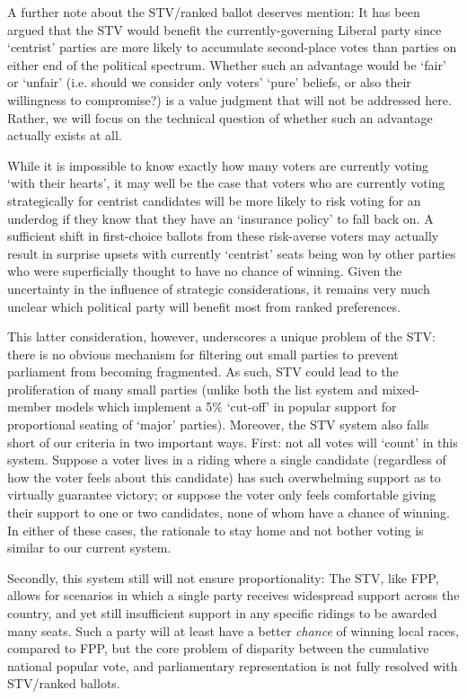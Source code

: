 \documentclass[DIV=calc, paper=a4, fontsize=11pt, twocolumn]{scrartcl}	 %
\begin{document}
A further note about the STV/ranked ballot deserves mention: It has been argued\cite{Record}
 that the STV would benefit the currently-governing Liberal party since  `centrist' parties are more likely to accumulate second-place votes than parties on either end of the political spectrum. 
Whether such an advantage would be `fair' or `unfair' (i.e. should we consider only voters' `pure' beliefs, or also their willingness to compromise?) is a value judgment that will not be addressed here. Rather, we will focus on the technical question of whether such an advantage actually exists at all.

While it is impossible to know exactly how many voters are currently voting `with their hearts', it may well be the case that voters who are currently voting strategically for centrist candidates will be more likely to risk voting for an underdog if they know that they have an `insurance policy' to fall back on. 
A sufficient shift in first-choice ballots from these risk-averse voters may actually result in surprise upsets with currently `centrist' seats being won by other parties who were superficially thought to have no chance of winning. Given the uncertainty in the influence of strategic considerations, it remains very much unclear which political party will benefit most from ranked preferences. 

This latter consideration, however, underscores a unique problem of the STV:  there is no obvious mechanism for filtering out small parties to prevent parliament from becoming fragmented. As such, STV could lead to the proliferation of many small parties
(unlike both the list system and  mixed-member models which implement a 5\% `cut-off' in popular support for proportional seating of `major' parties). 
Moreover, the STV system also falls short of our criteria in two important ways.
First: not all votes will `count' in this system. Suppose a voter lives in a riding where a single candidate (regardless of how the voter feels about this candidate) has such overwhelming support as to virtually guarantee victory; or suppose the voter only feels comfortable giving their support to one or two candidates, none of whom have a chance of winning. In either of these cases, the rationale to stay home and not bother voting is similar to our current system. 

Secondly, this system still will not ensure proportionality: The STV, like FPP, allows for scenarios in which a single party receives widespread support across the country, and yet still insufficient support in any specific ridings to be awarded many seats. Such a party will at least have a better \emph{chance} of winning local races, compared to FPP, but the core problem of disparity between the cumulative national popular vote, and parliamentary representation is not fully resolved with STV/ranked ballots.
\end{document}
